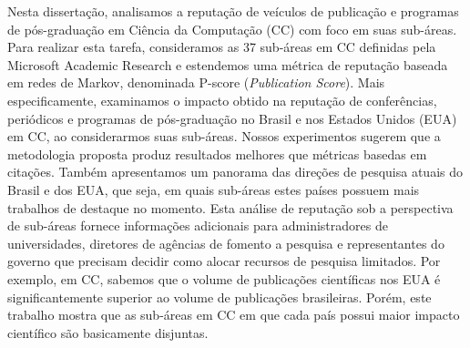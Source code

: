Nesta dissertação, analisamos a reputação de veículos de publicação e programas de pós-graduação em Ciência da Computação (CC) com foco em suas sub-áreas. Para realizar esta tarefa, consideramos as 37 sub-áreas em CC definidas pela Microsoft Academic Research e estendemos uma métrica de reputação baseada em redes de Markov, denominada P-score (\textit{Publication Score}).
%
Mais especificamente, examinamos o impacto obtido na reputação de conferências, periódicos e programas de pós-graduação no Brasil e nos Estados Unidos (EUA) em CC, ao considerarmos suas sub-áreas.
%
Nossos experimentos sugerem que a metodologia proposta produz resultados melhores que métricas basedas em citações. Também apresentamos um panorama das direções de pesquisa atuais do Brasil e dos EUA, que seja, em quais sub-áreas estes países possuem mais trabalhos de destaque no momento.
%
Esta análise de reputação sob a perspectiva de sub-áreas fornece informações adicionais para administradores de universidades, diretores de agências de fomento a pesquisa e representantes do governo que precisam decidir como alocar recursos de pesquisa limitados. Por exemplo, em CC, sabemos que o volume de publicações científicas nos EUA é significantemente superior ao volume de publicações brasileiras. Porém, este trabalho mostra que as sub-áreas em CC em que cada país possui maior impacto científico são basicamente disjuntas.


%
